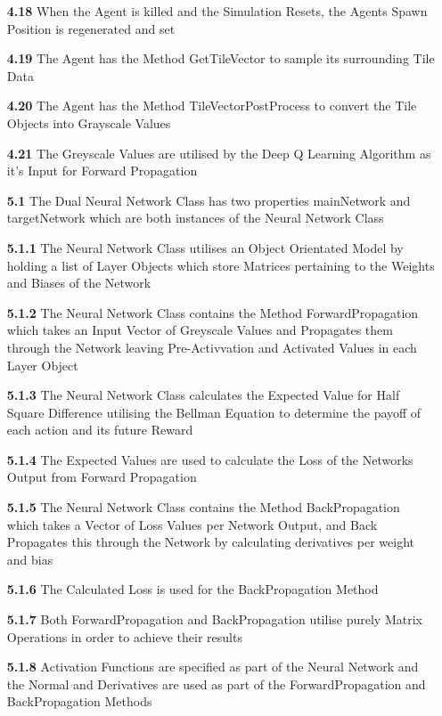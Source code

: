 \begin{flushleft}
\begin{itemize}
            \item[\textbf{4.18}] When the Agent is killed and the Simulation Resets, the Agents Spawn Position is regenerated and set
            \item[\textbf{4.19}] The Agent has the Method \textsf{GetTileVector} to sample its surrounding Tile Data
            \item[\textbf{4.20}] The Agent has the Method \textsf{TileVectorPostProcess} to convert the Tile Objects into Grayscale Values
            \item[\textbf{4.21}] The Greyscale Values are utilised by the Deep Q Learning Algorithm as it's Input for Forward Propagation
            \item[\textbf{5.1}] The Dual Neural Network Class has two properties \textsf{mainNetwork} and \textsf{targetNetwork} which are both instances of the Neural Network Class
            \item[\textbf{5.1.1}] The Neural Network Class utilises an Object Orientated Model by holding a list of Layer Objects which store Matrices pertaining to the Weights and Biases of the Network
            \item[\textbf{5.1.2}] The Neural Network Class contains the Method \textsf{ForwardPropagation} which takes an Input Vector of Greyscale Values and Propagates them through the Network leaving Pre-Activvation and Activated Values in each Layer Object
            \item[\textbf{5.1.3}] The Neural Network Class calculates the Expected Value for Half Square Difference utilising the Bellman Equation to determine the payoff of each action and its future Reward
            \item[\textbf{5.1.4}] The Expected Values are used to calculate the Loss of the Networks Output from Forward Propagation
            \item[\textbf{5.1.5}] The Neural Network Class contains the Method \textsf{BackPropagation} which takes a Vector of Loss Values per Network Output, and Back Propagates this through the Network by calculating derivatives per weight and bias
            \item[\textbf{5.1.6}] The Calculated Loss is used for the \textsf{BackPropagation} Method
            \item[\textbf{5.1.7}] Both \textsf{ForwardPropagation} and \textsf{BackPropagation} utilise purely Matrix Operations in order to achieve their results
            \item[\textbf{5.1.8}] Activation Functions are specified as part of the Neural Network and the Normal and Derivatives are used as part of the \textsf{ForwardPropagation} and \textsf{BackPropagation} Methods

\end{itemize}
\end{flushleft}
